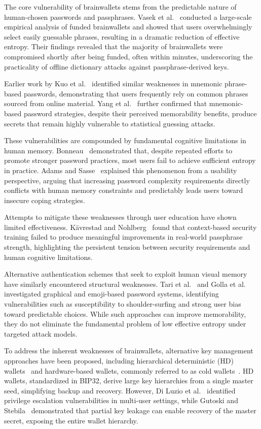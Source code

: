 \documentclass[journal,article,submit,pdftex,moreauthors]{Definitions/mdpi}
\begin{document}
The core vulnerability of brainwallets stems from the predictable nature of human-chosen passwords and passphrases. Vasek et al.~\cite{Vasek2017} conducted a large-scale empirical analysis of funded brainwallets and showed that users overwhelmingly select easily guessable phrases, resulting in a dramatic reduction of effective entropy. Their findings revealed that the majority of brainwallets were compromised shortly after being funded, often within minutes, underscoring the practicality of offline dictionary attacks against passphrase-derived keys.

Earlier work by Kuo et al.~\cite{Kuo2006} identified similar weaknesses in mnemonic phrase-based passwords, demonstrating that users frequently rely on common phrases sourced from online material. Yang et al.~\cite{Yang2016} further confirmed that mnemonic-based password strategies, despite their perceived memorability benefits, produce secrets that remain highly vulnerable to statistical guessing attacks.

These vulnerabilities are compounded by fundamental cognitive limitations in human memory. Bonneau~\cite{Bonneau2012,6234435} demonstrated that, despite repeated efforts to promote stronger password practices, most users fail to achieve sufficient entropy in practice. Adams and Sasse~\cite{Adams1999, Sasse2001} explained this phenomenon from a usability perspective, arguing that increasing password complexity requirements directly conflicts with human memory constraints and predictably leads users toward insecure coping strategies.

Attempts to mitigate these weaknesses through user education have shown limited effectiveness. Kävrestad and Nohlberg~\cite{Kavrestad2020} found that context-based security training failed to produce meaningful improvements in real-world passphrase strength, highlighting the persistent tension between security requirements and human cognitive limitations.

Alternative authentication schemes that seek to exploit human visual memory have similarly encountered structural weaknesses. Tari et al.~\cite{Tari2006} and Golla et al.~\cite{Golla2017} investigated graphical and emoji-based password systems, identifying vulnerabilities such as susceptibility to shoulder-surfing and strong user bias toward predictable choices. While such approaches can improve memorability, they do not eliminate the fundamental problem of low effective entropy under targeted attack models.

To address the inherent weaknesses of brainwallets, alternative key management approaches have been proposed, including hierarchical deterministic (HD) wallets~\cite{DiLuzio2020, Gutoski2015} and hardware-based wallets, commonly referred to as cold wallets~\cite{Das2019,8726762}. HD wallets, standardized in BIP32, derive large key hierarchies from a single master seed, simplifying backup and recovery. However, Di Luzio et al.~\cite{DiLuzio2020} identified privilege escalation vulnerabilities in multi-user settings, while Gutoski and Stebila~\cite{Gutoski2015} demonstrated that partial key leakage can enable recovery of the master secret, exposing the entire wallet hierarchy.
\end{document}
